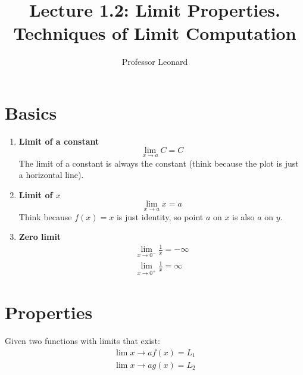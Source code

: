 \documentclass{article}
\begin{document}
\title{Lecture 1.2: Limit Properties. Techniques of Limit Computation}
\author{Professor Leonard}
\maketitle

\section{Basics}

\begin{enumerate}
    \item \textbf{Limit of a constant}
$$
\lim_{x \to a} C = C
$$
The limit of a constant is always the constant (think because the plot is just a
horizontal line).

    \item \textbf{Limit of $x$}
        $$
        \lim_{x\to a} x = a
        $$
        Think because $f(x) = x$ is just identity, so point $a$ on $x$ is also $a$ on $y$.

    \item \textbf{Zero limit}
        \begin{align*}
            \lim_{x\to 0^-} \frac{1}{x}= -\infty\\
            \lim_{x\to 0^+} \frac{1}{x} = \infty
        \end{align*}

\end{enumerate}

\section{Properties}

Given two functions with limits that exist:
\begin{align*}
    \lim{x\to a}f(x) = L_1\\
    \lim{x\to a} g(x) = L_2
\end{align*}
\end{document}
